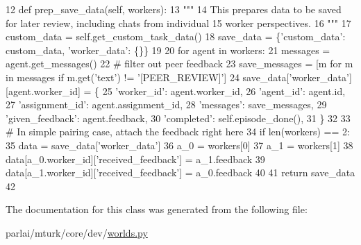 \begin{DoxyCode}
12     \textcolor{keyword}{def }prep\_save\_data(self, workers):
13         \textcolor{stringliteral}{"""}
14 \textcolor{stringliteral}{        This prepares data to be saved for later review, including chats from individual}
15 \textcolor{stringliteral}{        worker perspectives.}
16 \textcolor{stringliteral}{        """}
17         custom\_data = self.get\_custom\_task\_data()
18         save\_data = \{\textcolor{stringliteral}{'custom\_data'}: custom\_data, \textcolor{stringliteral}{'worker\_data'}: \{\}\}
19 
20         \textcolor{keywordflow}{for} agent \textcolor{keywordflow}{in} workers:
21             messages = agent.get\_messages()
22             \textcolor{comment}{# filter out peer feedback}
23             save\_messages = [m \textcolor{keywordflow}{for} m \textcolor{keywordflow}{in} messages \textcolor{keywordflow}{if} m.get(\textcolor{stringliteral}{'text'}) != \textcolor{stringliteral}{'[PEER\_REVIEW]'}]
24             save\_data[\textcolor{stringliteral}{'worker\_data'}][agent.worker\_id] = \{
25                 \textcolor{stringliteral}{'worker\_id'}: agent.worker\_id,
26                 \textcolor{stringliteral}{'agent\_id'}: agent.id,
27                 \textcolor{stringliteral}{'assignment\_id'}: agent.assignment\_id,
28                 \textcolor{stringliteral}{'messages'}: save\_messages,
29                 \textcolor{stringliteral}{'given\_feedback'}: agent.feedback,
30                 \textcolor{stringliteral}{'completed'}: self.episode\_done(),
31             \}
32 
33         \textcolor{comment}{# In simple pairing case, attach the feedback right here}
34         \textcolor{keywordflow}{if} len(workers) == 2:
35             data = save\_data[\textcolor{stringliteral}{'worker\_data'}]
36             a\_0 = workers[0]
37             a\_1 = workers[1]
38             data[a\_0.worker\_id][\textcolor{stringliteral}{'received\_feedback'}] = a\_1.feedback
39             data[a\_1.worker\_id][\textcolor{stringliteral}{'received\_feedback'}] = a\_0.feedback
40 
41         \textcolor{keywordflow}{return} save\_data
42 
\end{DoxyCode}


The documentation for this class was generated from the following file\+:\begin{DoxyCompactItemize}
\item 
parlai/mturk/core/dev/\hyperlink{parlai_2mturk_2core_2dev_2worlds_8py}{worlds.\+py}\end{DoxyCompactItemize}
